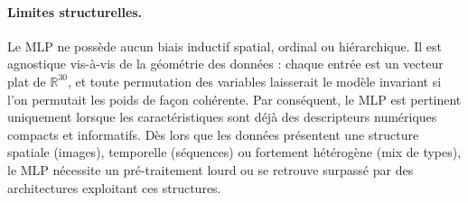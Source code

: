 \paragraph{Limites structurelles.}
Le MLP ne possède aucun biais inductif spatial, ordinal ou hiérarchique. Il est
agnostique vis-à-vis de la géométrie des données : chaque entrée est un vecteur
plat de $\mathbb{R}^{30}$, et toute permutation des variables laisserait
le modèle invariant si l'on permutait les poids de façon cohérente.
Par conséquent, le MLP est pertinent uniquement lorsque les caractéristiques sont
déjà des descripteurs numériques compacts et informatifs. Dès lors que les données
présentent une structure spatiale (images), temporelle (séquences) ou fortement
hétérogène (mix de types), le MLP nécessite un pré-traitement lourd ou se retrouve
surpassé par des architectures exploitant ces structures.
